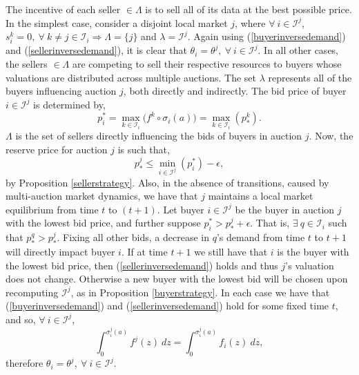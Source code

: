 \documentclass[sigconf, anonymous]{acmart}
\newcommand{\mcI}{\mathcal{I}}
\newcommand{\g}{\sigma}
\theoremstyle{definition}
\begin{document}
The incentive of each seller $\in\Lambda$ is to sell all of its data at the
best possible price. In the simplest case,
consider a disjoint local market $j$, where $\forall \ i\in\mcI^j$, $s_i^k = 0,
\ \forall \ k\ne j \in \mcI_i \Rightarrow \Lambda = \lbrace j \rbrace$ and
$\lambda = \mcI^j$. 
Again using (\ref{buyerinversedemand}) and  (\ref{sellerinversedemand}), it is
clear that $\theta_i = \theta^j, \ \forall \ i \in \mcI^j$.
In all other cases, the sellers $\in\Lambda$ are competing to sell
their respective resources to buyers whose valuations are distributed across multiple auctions. 
The set $\lambda$ represents all of the buyers influencing auction $j$, both
directly and indirectly. 
The bid price of buyer $i\in\mcI^j$ is determined by,
\begin{equation}\label{maxbid}
    p_i^* = \max_{k\in\mcI_i}\big(f^k \circ \g_i(a)\big)= \max_{k\in\mcI_i}(p_*^k).
\end{equation}
$\Lambda$ is the set of sellers directly influencing the bids of buyers
in auction $j$. Now, the reserve price for auction $j$ is such that,
\begin{equation}\label{resprice}
    p_*^j \le \min_{i\in\mcI^j}(p_i^*) - \epsilon,
\end{equation}
by Proposition \ref{sellerstrategy}. 
Also, in the absence of transitions, caused by multi-auction market dynamics, we have 
that $j$ maintains a local market
equilibrium from time $t$ to $(t+1)$. Let buyer $i\in\mcI^j$ be the buyer in auction $j$ with the lowest bid price,
and further suppose $p_i^* > p_*^j + \epsilon$. That is, $\exists \ q \in \mcI_i$ such
that $p_*^q > p_*^j$. Fixing all other bids, a decrease in $q$'s demand from time $t$ to $t+1$ will
directly impact buyer $i$. If at time $t+1$ we still have that $i$ is the
buyer with the lowest bid price, then (\ref{sellerinversedemand}) holds and
thus $j$'s valuation does not change. Otherwise a new buyer with the lowest bid will be chosen upon
recomputing $\mcI^j$, as in Proposition \ref{buyerstrategy}. 
In each case we
have that (\ref{buyerinversedemand}) and (\ref{sellerinversedemand}) hold for
some fixed time $t$, and so, $\forall \ i \in\mcI^j$,
\begin{equation}\label{jdemand}
    \int_0^{\g_i^j(a)} f^j(z) \ dz 
    = \int_0^{\g_i^j(a)} f_i(z) \ dz,
\end{equation}
therefore $\theta_i = \theta^j, \ \forall \ i \in \mcI^j$.
\end{document}

